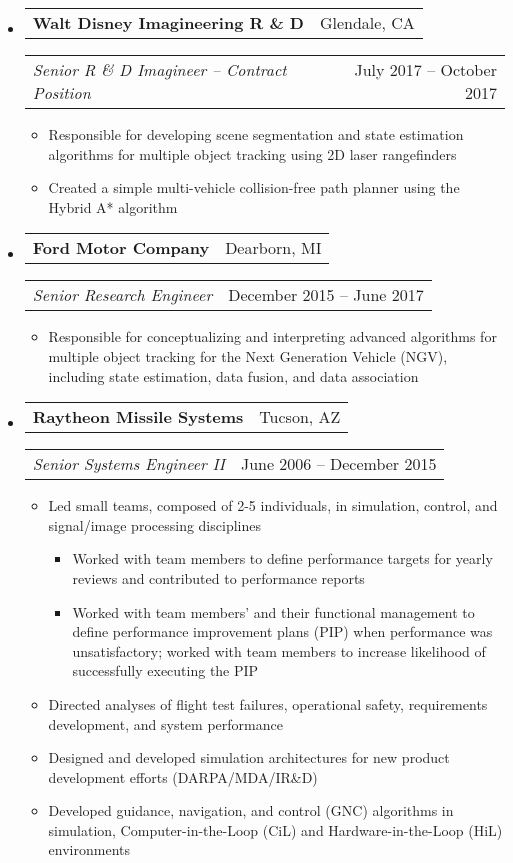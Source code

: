 \documentclass[letterpaper,18pt]{article}
\makeatletter
\newcommand{\resitem}[1]{\item #1 \vspace{-2pt}}
\newcommand{\headerrow}[2]{%
  \hspace*{-\labelsep}%
  \begin{tabular*}{\dimexpr\linewidth+\labelsep}{@{\extracolsep{\fill}}lr@{}}
    #1 &
    #2 \\
  \end{tabular*}%
}
\makeatother
\begin{document}
\begin{itemize}[label={},leftmargin=*,noitemsep]
\item
	\headerrow{\textbf{Walt Disney Imagineering R \& D}}{Glendale, CA}
	\headerrow{\emph{Senior R \& D Imagineer -- Contract Position}}{July 2017 -- October 2017}
	{\small
	\begin{itemize}[noitemsep]
		\resitem{Responsible for developing scene segmentation and state estimation algorithms for multiple object tracking using 2D laser rangefinders}
        \resitem{Created a simple multi-vehicle collision-free path planner using the Hybrid A* algorithm}
	\end{itemize}
	}
\item
	\headerrow{\textbf{Ford Motor Company}}{Dearborn, MI}
	\headerrow{\emph{Senior Research Engineer}}{December 2015 -- June 2017}
	{\small
	\begin{itemize}[noitemsep]
		\resitem{Responsible for conceptualizing and interpreting advanced algorithms for multiple object tracking for the Next Generation Vehicle (NGV), including state estimation, data fusion, and data association}
	\end{itemize}
        }
\item
	\headerrow{\textbf{Raytheon Missile Systems}}{Tucson, AZ}
	\headerrow{\emph{Senior Systems Engineer II}}{June 2006 -- December 2015}
	{\small
	\begin{itemize}[noitemsep]
     \resitem{Led small teams, composed of 2-5 individuals, in simulation, control, and signal/image processing disciplines}
        \begin{itemize}[noitemsep]
                \resitem{Worked with team members to define performance targets for yearly reviews and contributed to performance reports}
                \resitem{Worked with team members' and their functional management to define performance improvement plans (PIP) when performance was unsatisfactory; worked with team members to increase likelihood of successfully executing the PIP}
        \end{itemize}
	 \resitem{Directed analyses of flight test failures, operational safety, requirements development, and system performance}
      \resitem{Designed and developed simulation architectures for new product development efforts (DARPA/MDA/IR\&D)}
	  \resitem{Developed guidance, navigation, and control (GNC) algorithms in simulation, Computer-in-the-Loop (CiL) and Hardware-in-the-Loop (HiL) environments}
	\end{itemize}
	}
\end{itemize}
\end{document}
